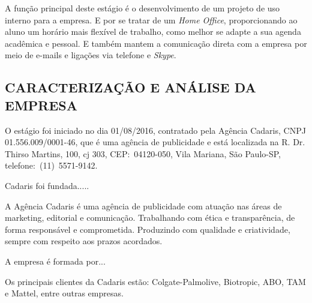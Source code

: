 \documentclass[
  12pt,				%
  openany,
  oneside,
  a4paper,			%
  english,			%
  brazil
]{article}
\numberwithin{figure}{section}
\numberwithin{table}{section}
\begin{document}
A função principal deste estágio é o desenvolvimento de um projeto de uso interno para a empresa. E por se tratar de um \textit{Home Office}, proporcionando ao aluno um horário mais flexível de trabalho, como melhor se adapte a sua agenda acadêmica e pessoal. E também mantem a comunicação direta com a empresa por meio de e-mails e ligações via telefone e \textit{Skype}.



\subsection{CARACTERIZAÇÃO E ANÁLISE DA EMPRESA}





O estágio foi iniciado no dia 01/08/2016, contratado pela Agência Cadaris, CNPJ 01.556.009/0001-46, que é uma agência de publicidade e está localizada na R. Dr. Thirso Martins, 100, cj 303, CEP:~04120-050, Vila Mariana, São Paulo-SP, telefone:~(11)~5571-9142.

Cadaris foi fundada.....

A Agência Cadaris é uma agência de publicidade com atuação nas áreas de marketing, editorial e comunicação. Trabalhando com ética e transparência, de forma responsável e comprometida. Produzindo com qualidade e criatividade, sempre com respeito aos prazos acordados.

A empresa é formada por...

Os principais clientes da Cadaris estão: Colgate-Palmolive, Biotropic, ABO, TAM e Mattel, entre outras empresas.
\end{document}
